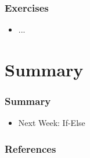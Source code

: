 \documentclass{beamer}
\begin{document}
	\begin{frame}
		\frametitle{Exercises}
		\begin{itemize}
			\item ...
		\end{itemize}
	\end{frame}
	
	\section{Summary}
	
	\begin{frame}
		\frametitle{Summary}
		\begin{itemize}
			\item Next Week: If-Else
		\end{itemize}
	\end{frame}

	\begin{frame}
		\frametitle{References}
	\end{frame}
\end{document}
